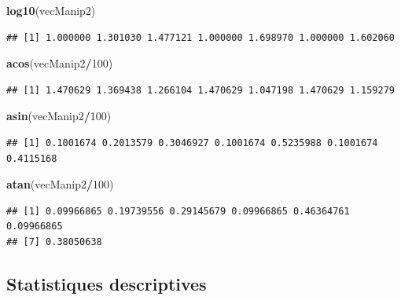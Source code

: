 \documentclass[]{book}
\newenvironment{Shaded}{\begin{snugshade}}{\end{snugshade}}
\newcommand{\DecValTok}[1]{\textcolor[rgb]{0.00,0.00,0.81}{#1}}
\newcommand{\KeywordTok}[1]{\textcolor[rgb]{0.13,0.29,0.53}{\textbf{#1}}}
\newcommand{\NormalTok}[1]{#1}
\newcommand{\OperatorTok}[1]{\textcolor[rgb]{0.81,0.36,0.00}{\textbf{#1}}}
\begin{document}
\begin{Shaded}
\begin{Highlighting}[]
\KeywordTok{log10}\NormalTok{(vecManip2)}
\end{Highlighting}
\end{Shaded}

\begin{verbatim}
## [1] 1.000000 1.301030 1.477121 1.000000 1.698970 1.000000 1.602060
\end{verbatim}

\begin{Shaded}
\begin{Highlighting}[]
\KeywordTok{acos}\NormalTok{(vecManip2}\OperatorTok{/}\DecValTok{100}\NormalTok{)}
\end{Highlighting}
\end{Shaded}

\begin{verbatim}
## [1] 1.470629 1.369438 1.266104 1.470629 1.047198 1.470629 1.159279
\end{verbatim}

\begin{Shaded}
\begin{Highlighting}[]
\KeywordTok{asin}\NormalTok{(vecManip2}\OperatorTok{/}\DecValTok{100}\NormalTok{)}
\end{Highlighting}
\end{Shaded}

\begin{verbatim}
## [1] 0.1001674 0.2013579 0.3046927 0.1001674 0.5235988 0.1001674 0.4115168
\end{verbatim}

\begin{Shaded}
\begin{Highlighting}[]
\KeywordTok{atan}\NormalTok{(vecManip2}\OperatorTok{/}\DecValTok{100}\NormalTok{)}
\end{Highlighting}
\end{Shaded}

\begin{verbatim}
## [1] 0.09966865 0.19739556 0.29145679 0.09966865 0.46364761 0.09966865
## [7] 0.38050638
\end{verbatim}

\hypertarget{statistiques-descriptives}{%
\subsection{Statistiques descriptives}\label{statistiques-descriptives}}
\end{document}
